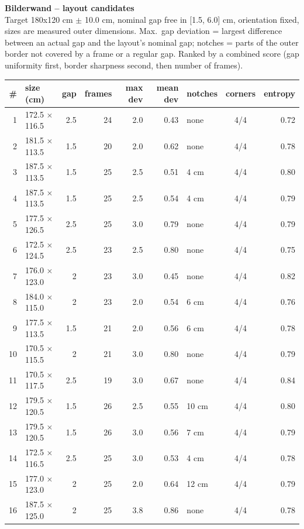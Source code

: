 \documentclass[a4paper,landscape,10pt]{article}
\begin{document}
{\LARGE\bfseries Bilderwand -- layout candidates}\\[4pt]
{\small Target 180x120 cm $\pm$ 10.0 cm, nominal gap free in
[1.5, 6.0] cm, orientation fixed, sizes are measured outer dimensions.
Max.\ gap deviation = largest difference between an actual gap and the layout's nominal gap;
notches = parts of the outer border not covered by a frame or a regular gap. Ranked by a combined
score (gap uniformity first, border sharpness second, then number of frames).}\\[10pt]
\begin{minipage}[t]{0.6\textwidth}\vspace{0pt}
\begin{tabular}{@{}r l r r r r l c r@{}}
\toprule
\# & size (cm) & gap & frames & max dev & mean dev & notches & corners & entropy \\
\midrule
1 & 172.5 $\times$ 116.5 & 2.5 & 24 & 2.0 & 0.43 & none & 4/4 & 0.72 \\
2 & 181.5 $\times$ 113.5 & 1.5 & 20 & 2.0 & 0.62 & none & 4/4 & 0.78 \\
3 & 187.5 $\times$ 113.5 & 1.5 & 25 & 2.5 & 0.51 & 4 cm & 4/4 & 0.80 \\
4 & 187.5 $\times$ 113.5 & 1.5 & 25 & 2.5 & 0.54 & 4 cm & 4/4 & 0.79 \\
5 & 177.5 $\times$ 126.5 & 2.5 & 25 & 3.0 & 0.79 & none & 4/4 & 0.79 \\
6 & 172.5 $\times$ 124.5 & 2.5 & 23 & 2.5 & 0.80 & none & 4/4 & 0.75 \\
7 & 176.0 $\times$ 123.0 & 2 & 23 & 3.0 & 0.45 & none & 4/4 & 0.82 \\
8 & 184.0 $\times$ 115.0 & 2 & 23 & 2.0 & 0.54 & 6 cm & 4/4 & 0.76 \\
9 & 177.5 $\times$ 113.5 & 1.5 & 21 & 2.0 & 0.56 & 6 cm & 4/4 & 0.78 \\
10 & 170.5 $\times$ 115.5 & 2 & 21 & 3.0 & 0.80 & none & 4/4 & 0.79 \\
11 & 170.5 $\times$ 117.5 & 2.5 & 19 & 3.0 & 0.67 & none & 4/4 & 0.84 \\
12 & 179.5 $\times$ 120.5 & 1.5 & 26 & 2.5 & 0.55 & 10 cm & 4/4 & 0.80 \\
13 & 179.5 $\times$ 120.5 & 1.5 & 26 & 3.0 & 0.56 & 7 cm & 4/4 & 0.79 \\
14 & 172.5 $\times$ 116.5 & 2.5 & 25 & 3.0 & 0.53 & 4 cm & 4/4 & 0.78 \\
15 & 177.0 $\times$ 123.0 & 2 & 25 & 2.0 & 0.64 & 12 cm & 4/4 & 0.79 \\
16 & 187.5 $\times$ 125.0 & 2 & 25 & 3.8 & 0.86 & none & 4/4 & 0.78 \\
\bottomrule
\end{tabular}
\end{minipage}\hfill
\end{document}
